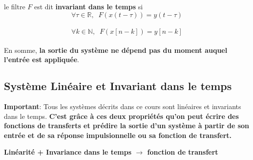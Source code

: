 \documentclass[11pt,a4paper]{article}
\begin{document}
le filtre $F$  est dit \textbf{invariant dans le temps} si \\

\[\forall \tau \in \mathbb{R}, \;\; F(x(t-\tau)) = y(t-\tau)\]\\

\[\forall k \in \mathbb{N}, \;\; F(x[n-k]) = y[n-k]\]\\

En somme, \textbf{la sortie du système ne dépend pas du moment auquel l'entrée est appliquée}.

\subsection*{Système Linéaire et Invariant dans le temps}
\textbf{Important}: Tous les systèmes décrits dans ce cours sont linéaires et invariants dans le temps. \textbf{C'est grâce à ces deux propriétés qu'on peut écrire des fonctions de transferts et prédire la sortie d'un système à partir de son entrée et de sa réponse impulsionnelle ou sa fonction de transfert.}\\

\begin{center}
\textbf{Linéarité + Invariance dans le temps $\rightarrow$ fonction de transfert}
\end{center}
\end{document}
